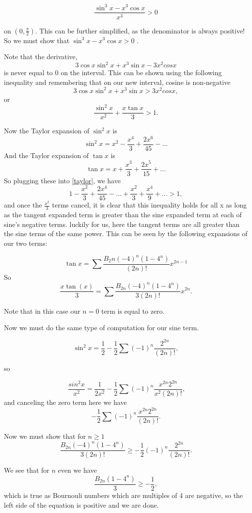 \documentclass[12pt]{report}
\numberwithin{definition}{section}
\begin{document}
 \[ \frac{\sin^3{x}-x^3\cos{x}}{x^3}>0 \] 
 
 on $(0, \frac{\pi}{2})$. 
 This can be further simplified, as the denominator is always positive! 
 So we must show that $\sin^3{x}-x^3\cos{x}>0$ .


 Note that the derivative, 
\[3\cos{x}\sin^2{x}+x^3\sin{x}-3x^2 cos{x}\]
 is never equal to 0 on the interval. This can be shown using the following inequality and remembering that on our new interval, cosine is non-negative
 \[3\cos{x}\sin^2{x}+x^3\sin{x}>3x^2 cos{x},\]
 or 
  \begin{equation}\label{taylor}
        \frac{\sin^2{x}}{x^2}+\frac{x \tan{x}}{3}>1. 
  \end{equation}

  
  Now the Taylor expansion of $\sin^2{x}$ is 
  \[\sin^2{x} = x^2- \frac{x^4}{3}+\frac{2x^6}{45}-...\]
  And the Taylor expansion of $\tan{x}$ is 
  \[\tan{x} = x+\frac{x^3}{3}+\frac{2x^5}{15}+...\]
  So plugging these into \eqref{taylor}, we have 
  \[1-\frac{x^2}{3}+\frac{2x^4}{45}-...+\frac{x^2}{3}+\frac{x^4}{9}+...>1,\]
  and once the $\frac{x^2}{3}$ terms cancel, it is clear that this inequality holds for all x as long as the tangent expanded term is greater than the sine expanded term at each of sine's negative terms. luckily for us, here the tangent terms are all greater than the sine terms of the same power. This can be seen by the following expansions of our two terms: 
  
  \[\tan{x} =\sum  \frac{B_2n(-4)^n(1-4^n)}{(2n)!}x^{2n-1} \]
  So 
    \[\frac{x \tan{(x)}}{3} = \sum \frac{B_{2n}(-4)^n(1-4^n)}{3(2n)!}x^{2n} .\]
    
  Note that in this case our $n=0$ term is equal to zero. 

Now we must do the same type of computation for our sine term. 

  \[
  \sin^2{x} = \frac{1}{2}-\frac{1}{2} \sum (-1)^n\frac{2^{2n}}{(2n)!},
  \]
  
  so 
  
  \[
   \ \frac {sin^2{x}}{x^2} = \frac{1}{2x^2}-\frac{1}{2} \sum (-1)^n\frac{x^{2n}2^{2n}}{x^2(2n)!},
   \]
  and canceling the zero term here we have 
   \[
   -\frac{1}{2} \sum (-1)^n\frac{x^{2n}2^{2n}}{(2n)!}.
   \]
  
 Now we must show that for $n \geq 1$
 \[
 \frac{B_{2n}(-4)^n(1-4^n)}{3(2n)!} \geq -\frac{1}{2}(-1)^n \frac{2^{2n}}{(2n)!}.
 \]
 
 We see that for $n$ even we have 
 \[
 \frac{B_{2n}(1-4^n)}{3} \geq -\frac{1}{2},
 \]
 which is true as Bournouli numbers which are multiples of 4 are negative, so the left side of the equation is positive and we are done.
 
\end{document}
